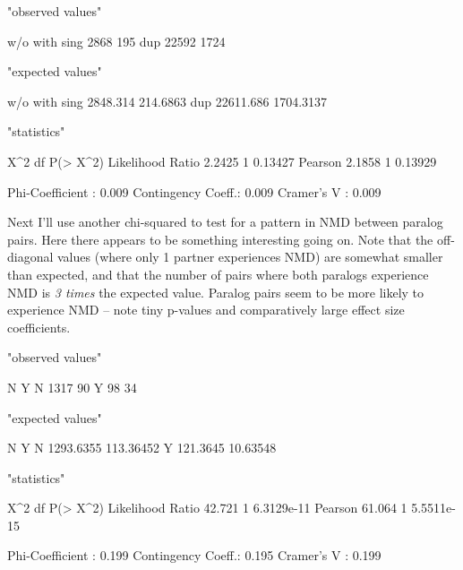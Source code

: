 \documentclass{article}
\begin{document}
\begin{Schunk}
\begin{Soutput}
[1] "observed values"
\end{Soutput}
\begin{Soutput}
       w/o with
sing  2868  195
dup  22592 1724
\end{Soutput}
\begin{Soutput}
[1] "expected values"
\end{Soutput}
\begin{Soutput}
           w/o      with
sing  2848.314  214.6863
dup  22611.686 1704.3137
\end{Soutput}
\begin{Soutput}
[1] "statistics"
\end{Soutput}
\begin{Soutput}
                    X^2 df P(> X^2)
Likelihood Ratio 2.2425  1  0.13427
Pearson          2.1858  1  0.13929

Phi-Coefficient   : 0.009 
Contingency Coeff.: 0.009 
Cramer's V        : 0.009 
\end{Soutput}
\end{Schunk}

Next I'll use another chi-squared to test for a pattern in NMD between paralog pairs. Here there appears to be something interesting going on. Note that the off-diagonal values (where only 1 partner experiences NMD) are somewhat smaller than expected, and that the number of pairs where both paralogs experience NMD is \textit{3 times} the expected value. Paralog pairs seem to be more likely to experience NMD -- note tiny p-values and comparatively large effect size coefficients.

\begin{Schunk}
\begin{Soutput}
[1] "observed values"
\end{Soutput}
\begin{Soutput}
     N  Y
N 1317 90
Y   98 34
\end{Soutput}
\begin{Soutput}
[1] "expected values"
\end{Soutput}
\begin{Soutput}
          N         Y
N 1293.6355 113.36452
Y  121.3645  10.63548
\end{Soutput}
\begin{Soutput}
[1] "statistics"
\end{Soutput}
\begin{Soutput}
                    X^2 df   P(> X^2)
Likelihood Ratio 42.721  1 6.3129e-11
Pearson          61.064  1 5.5511e-15

Phi-Coefficient   : 0.199 
Contingency Coeff.: 0.195 
Cramer's V        : 0.199 
\end{Soutput}
\end{Schunk}
\end{document}
